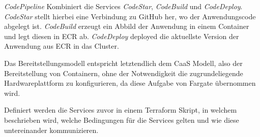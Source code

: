 \textit{\gls{CodePipeline}} Kombiniert die Services \textit{CodeStar}, \textit{CodeBuild} und \textit{CodeDeploy}. \textit{CodeStar} stellt hierbei eine Verbindung zu \gls{GitHub} her, wo der Anwendungscode abgelegt ist. \textit{CodeBuild} erzeugt ein Abbild der Anwendung in einem Container und legt diesen in \ac{ECR} ab. \textit{CodeDeploy} deployed die aktuellste Version der Anwendung aus \ac{ECR} in das Cluster.

Das Bereitstellungsmodell entspricht letztendlich dem \ac{CaaS} Modell, also der Bereitstellung von Containern, ohne der Notwendigkeit die zugrundeliegende Hardwareplattform zu konfigurieren, da diese Aufgabe von \gls{Fargate} übernommen wird.

Definiert werden die Services zuvor in einem \gls{Terraform} Skript, in welchem beschrieben wird, welche Bedingungen für die Services gelten und wie diese untereinander kommunizieren.